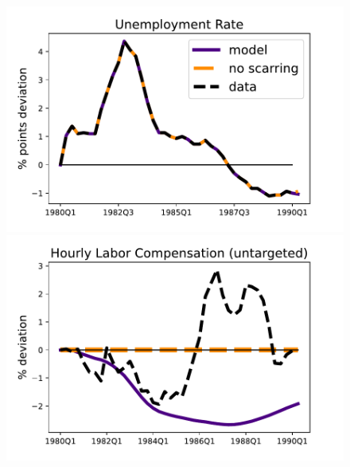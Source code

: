 \begin{figure}[H] %
\centering
\begin{minipage}{0.51\textwidth}
\includegraphics[scale=.57]{text/chapter1/Figures/80s/Urate_80s}
\end{minipage}\hspace*{\fill}
\begin{minipage}{0.51\textwidth}
\includegraphics[scale=.57]{text/chapter1/Figures/80s/hourly_comp_80s}
\end{minipage}


\end{figure}
